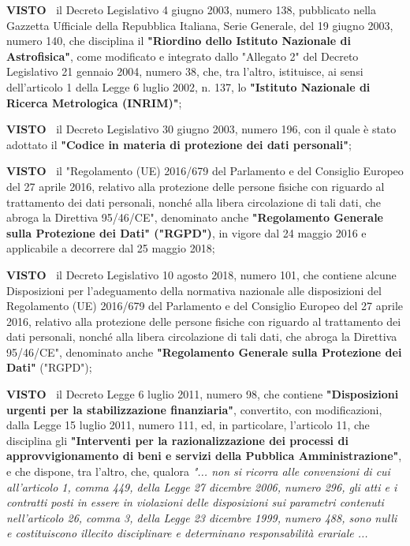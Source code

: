 \textbf{VISTO~}	il Decreto Legislativo 4 giugno 2003, numero 138,
pubblicato nella Gazzetta Ufficiale della Repubblica Italiana, Serie
Generale, del 19 giugno 2003, numero 140, che disciplina il \textbf{"Riordino
dello Istituto Nazionale di Astrofisica"}, come modificato e integrato
dallo "Allegato 2" del Decreto Legislativo 21 gennaio 2004, numero 38,
che, tra l’altro, istituisce, ai sensi dell’articolo 1 della Legge
6 luglio 2002, n. 137, lo \textbf{"Istituto Nazionale di Ricerca Metrologica
(INRIM)"};

\textbf{VISTO~}	il Decreto Legislativo 30 giugno 2003, numero 196, con
il quale è stato adottato il \textbf{"Codice in materia di protezione dei dati
personali"};

\textbf{VISTO~}	il "Regolamento (UE) 2016/679 del Parlamento e del
Consiglio Europeo del 27 aprile 2016, relativo alla protezione delle
persone fisiche con riguardo al trattamento dei dati personali, nonché
alla libera circolazione di tali dati, che abroga la Direttiva 95/46/CE",
denominato anche \textbf{"Regolamento Generale sulla Protezione dei Dati"
("RGPD")}, in vigore dal 24 maggio 2016 e applicabile a decorrere dal 25
maggio 2018;

\textbf{VISTO~}	il Decreto Legislativo 10 agosto 2018, numero 101,
che contiene alcune Disposizioni per l’adeguamento della normativa
nazionale alle disposizioni del Regolamento (UE) 2016/679 del Parlamento
e del Consiglio Europeo del 27 aprile 2016, relativo alla protezione
delle persone fisiche con riguardo al trattamento dei dati personali,
nonché alla libera circolazione di tali dati, che abroga la Direttiva
95/46/CE", denominato anche \textbf{"Regolamento Generale sulla Protezione dei
Dati"} ("RGPD");

\textbf{VISTO~}	il Decreto Legge 6 luglio 2011, numero 98, che contiene
\textbf{"Disposizioni urgenti per la stabilizzazione finanziaria"}, convertito,
con modificazioni, dalla Legge 15 luglio 2011, numero 111, ed, in
particolare, l’articolo 11, che disciplina gli \textbf{"Interventi per la
razionalizzazione dei processi di approvvigionamento di beni e servizi
della Pubblica Amministrazione"}, e che dispone, tra l’altro, che,
qualora \textit{"... non si ricorra alle convenzioni di cui all’articolo
1, comma 449, della Legge 27 dicembre 2006, numero 296, gli atti e i
contratti posti in essere in violazioni delle disposizioni sui parametri
contenuti nell’articolo 26, comma 3, della Legge 23 dicembre 1999,
numero 488, sono nulli e costituiscono illecito disciplinare e determinano
responsabilità erariale ...}

